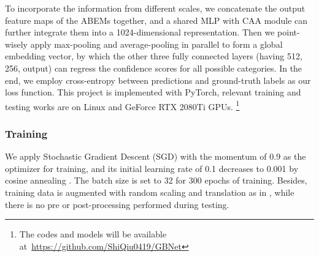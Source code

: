 \documentclass[journal,twoside]{IEEEtran}
\begin{document}
To incorporate the information from different scales, we concatenate the output feature maps of the ABEMs together, and a shared MLP with CAA module can further integrate them into a 1024-dimensional representation. Then we point-wisely apply max-pooling and average-pooling in parallel to form a global embedding vector, by which the other three fully connected layers (having 512, 256,  output) can regress the confidence scores for all possible categories. In the end, we employ cross-entropy between predictions and ground-truth labels as our loss function. This project is implemented with PyTorch, relevant training and testing works are on Linux and GeForce RTX 2080Ti GPUs. \footnote{The codes and models will be available at~\url{https://github.com/ShiQiu0419/GBNet}}

\subsubsection{Training}
We apply Stochastic Gradient Descent (SGD) with the momentum of 0.9 as the optimizer for training, and its initial learning rate of 0.1 decreases to 0.001 by cosine annealing \cite{loshchilov2016sgdr}. The batch size is set to 32 for 300 epochs of training. Besides, training data is augmented with random scaling and translation as in \cite{wang2019dynamic}, while there is no pre or post-processing performed during testing.
\end{document}
